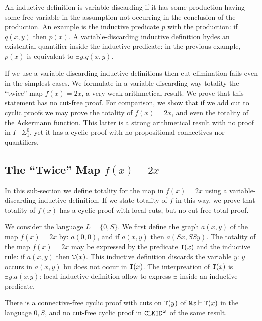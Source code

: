 \documentclass[a4paper,12pt]{article}
\newcommand{\Nat}               { {\tt N}  }
\newcommand{\Tot}           { {\tt T} }
\newcommand{\hy}        { {\operatorname{-}}}
\newcommand{\CLKID} { {\tt CLKID} }
\begin{document}
An inductive definition is variable-discarding if it has some production having some free variable in the assumption not occurring in the conclusion of the production. An example is the inductive predicate $p$ with the production: if $q(x,y)$ then $p(x)$. A variable-discarding inductive definition hydes an existential quantifier inside the inductive predicate: in the previous example, $p(x)$ is equivalent to $\exists y.q(x,y)$. 

If we use a variable-discarding inductive definitions then cut-elimination fails even in the simplest cases. We formulate in a variable-discarding way totality the ``twice'' map $f(x)=2x$, a very weak arithmetical result. We prove that this statement has no cut-free proof. For comparison, we show that if we add cut to cyclic proofs we may prove the totality of $f(x)=2x$, and even the totality of the Ackermann function. This latter is a strong arithmetical result with no proof in $I \hy \Sigma^0_1$, yet it has a cyclic proof with no propositional connectives nor quantifiers.

\newcommand{\quotationMarks}  [1] {{``#1''}}

\subsection{The \quotationMarks{Twice} Map $f(x)=2x$}
In this sub-section we define totality for the map in $f(x)=2x$ using a variable-discarding inductive definition. If we state totality of $f$ in this way, we prove that totality of $f(x)$ has a cyclic proof with local cuts, but no cut-free total proof. 

We consider the language $L = \{0, S\}$. We first define the graph $a(x,y)$ of the map $f(x)=2x$ by: $a(0,0)$, and if $a(x,y)$ then $a(Sx,SSy)$. The totality of the map $f(x)=2x$ may be expressed by the predicate $\Tot(x)$ and the inductive rule: if $a(x,y)$ then $\Tot(x)$. This inductive definition discards the variable $y$: $y$ occurs in $a(x,y)$ bu does not occur in $\Tot(x)$. The interpreation of $\Tot(x)$ is $\exists y.a(x.y)$: local inductive definition allow to express $\exists$ inside an inductive predicate. 

There is a connective-free cyclic proof with cuts on $\Tot(y)$ of $\Nat x \vdash \Tot(x)$ in the language $0,S$, and no cut-free cyclic proof in $\CLKID^\omega$ of the same result. 
\end{document}

